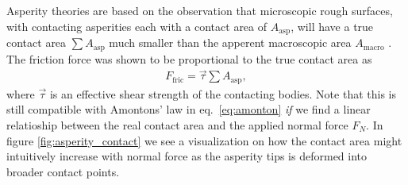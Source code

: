 Asperity theories are based on the observation that microscopic rough surfaces,
with contacting asperities each with a contact area of $A_{\text{asp}}$, will
have a true contact area $\sum A_{\text{asp}}$ much smaller
than the apperent macroscopic area $A_{\text{macro}}$ \cite{kim_nano-scale_2009}. The friction force was shown to be proportional to the true contact area as 
\begin{align*}
  F_\text{fric} = \vec{\tau} \sum A_{\text{asp}},
\end{align*}
where $\vec{\tau}$ is an effective shear strength of the contacting bodies. Note that this is still compatible with Amontons’ law in eq.~\eqref{eq:amonton} \textit{if} we find a linear relatioship between the real contact area and the applied normal force $F_N$. In figure \ref{fig:asperity_contact} we see a visualization on how the contact area might intuitively increase with normal force as the asperity tips is deformed into broader contact points.

